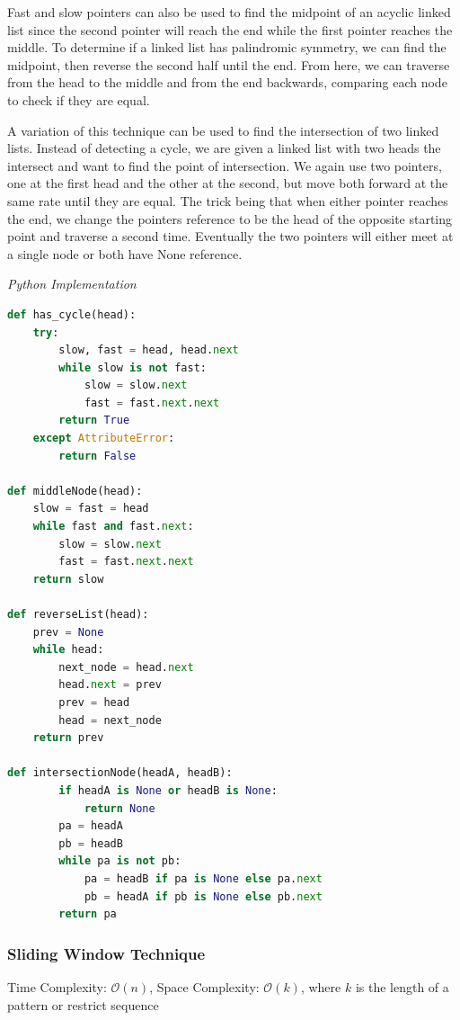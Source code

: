\documentclass{article}
\newcommand{\bigO}{\mathcal{O}}
\begin{document}
    Fast and slow pointers can also be used to find the midpoint of an acyclic linked list since the second pointer will reach the end while the first pointer reaches the middle. To determine if a linked list has palindromic symmetry, we can find the midpoint, then reverse the second half until the end. From here, we can traverse from the head to the middle and from the end backwards, comparing each node to check if they are equal.
    
    A variation of this technique can be used to find the intersection of two linked lists. Instead of detecting a cycle, we are given a linked list with two heads the intersect and want to find the point of intersection. We again use two pointers, one at the first head and the other at the second, but move both forward at the same rate until they are equal. The trick being that when either pointer reaches the end, we change the pointers reference to be the head of the opposite starting point and traverse a second time. Eventually the two pointers will either meet at a single node or both have None reference.  

\vspace{8pt} \emph{Python Implementation}
\begin{lstlisting}[language=Python]
def has_cycle(head):
    try:
        slow, fast = head, head.next
        while slow is not fast:
            slow = slow.next
            fast = fast.next.next
        return True
    except AttributeError:
        return False
        
def middleNode(head):
    slow = fast = head
    while fast and fast.next:
        slow = slow.next
        fast = fast.next.next
    return slow

def reverseList(head):
    prev = None
    while head:
        next_node = head.next
        head.next = prev
        prev = head
        head = next_node
    return prev
    
def intersectionNode(headA, headB):
        if headA is None or headB is None:
            return None
        pa = headA 
        pb = headB
        while pa is not pb:
            pa = headB if pa is None else pa.next
            pb = headA if pb is None else pb.next
        return pa
\end{lstlisting}


    \subsubsection{Sliding Window Technique}
    Time Complexity: $\bigO(n)$, Space Complexity: $\bigO(k)$, where $k$ is the length of a pattern or restrict sequence 
    
\end{document}
